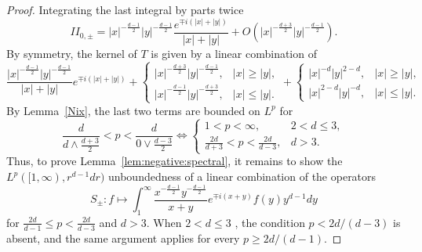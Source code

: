 \documentclass[12pt]{amsart}
\begin{document}
\begin{proof}
Integrating the last integral by parts twice
\begin{equation*}
    II_{0,\pm} = |x|^{-\frac{d-1}{2}} |y|^{-\frac{d-1}{2}} \frac{e^{\mp i (|x|+|y|)}}{|x|+|y|} + O\left( |x|^{-\frac{d+3}{2}} |y|^{-\frac{d-1}{2}} \right).
\end{equation*}
By symmetry, the kernel of $T$ is given by a linear combination of 
\begin{equation*}
     \frac{|x|^{-\frac{d-1}{2}} |y|^{-\frac{d-1}{2}}}{|x|+|y|}e^{\mp i (|x|+|y|)} + \begin{cases}
        |x|^{-\frac{d+3}{2}} |y|^{-\frac{d-1}{2}}, & |x|\ge |y|,\\
        |x|^{-\frac{d-1}{2}} |y|^{-\frac{d+3}{2}}, &|x|\le |y|.
    \end{cases} + \begin{cases}
        |x|^{-d} |y|^{2-d}, & |x|\ge |y|,\\
        |x|^{2-d} |y|^{-d}, &|x|\le |y|.
    \end{cases}
\end{equation*}
By Lemma~\ref{Nix}, the last two terms are bounded on $L^p$ for 
\begin{equation*}
    \frac{d}{d \wedge \frac{d+3}{2}} < p<\frac{d}{0\vee \frac{d-3}{2}} \iff \begin{cases}
        1<p<\infty, & 2<d\le 3,\\
        \frac{2d}{d+3}<p<\frac{2d}{d-3}, & d>3.
    \end{cases}
\end{equation*}
Thus, to prove Lemma~\ref{lem:negative:spectral}, it remains to show the $L^p([1,\infty),r^{d-1}dr)$ unboundedness of a linear combination of the operators
\begin{equation*}
    S_{\pm}: f \mapsto \int_1^\infty \frac{x^{-\frac{d-1}{2}} y^{-\frac{d-1}{2}}}{x+y}e^{\mp i (x+y)} f(y) y^{d-1} dy
\end{equation*}
for $\frac{2d}{d-1}\le p < \frac{2d}{d-3}$ and $d>3$. 
When $2<d\le 3$ , the condition \(p<2d/(d-3)\) is absent, and the same
argument applies for every  \(p\ge2d/(d-1)\). 



\end{proof}
\end{document}
